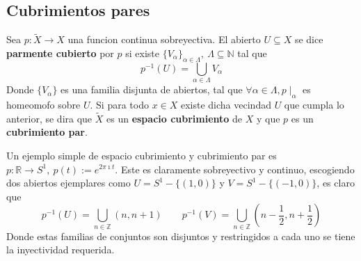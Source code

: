 \subsection{Cubrimientos pares}
\begin{definicion}
Sea \(p : \tilde{X} \to X\) una funcion continua sobreyectiva. El abierto \(U
\subseteq X\) se dice \textbf{parmente cubierto} por \(p\) si existe
\(\{V_\alpha\}_{\alpha \in \Lambda},\ \Lambda \subseteq \mathbb N\) tal que
\[ p^{-1} (U) = \bigcup_{\alpha \in \Lambda} V_\alpha \]
Donde \(\{V_\alpha\}\) es una familia disjunta de abiertos, tal que
\(\forall \alpha \in \Lambda, p \mid_{\alpha}\) es homeomofo sobre \(U\).
Si para todo \(x \in X\) existe dicha vecindad \(U\) que cumpla lo
anterior, se dira que \(\tilde{X}\) es un \textbf{espacio cubrimiento} de \(X\)
y que \(p\) es un \textbf{cubrimiento par}.
\end{definicion}

Un ejemplo simple de espacio cubrimiento y cubrimiento par es \(p :
\mathbb R \to S^1,\ p(t) := e^{2 \pi \imath t}\). Este es claramente
sobreyectivo y continuo, escogiendo dos abiertos ejemplares como \(U =
S^1 - \{(1,0)\}\) y \(V = S^1 - \{(-1,0)\}\), es claro que
\[
    p^{-1} (U) = \bigcup_{n \in \mathbb Z} (n, n+1)
    \qquad p^{-1} (V) = \bigcup_{n \in \mathbb Z} (n - \frac 1 2, n + \frac 1
    2 )
\]
Donde estas familias de conjuntos son disjuntos y restringidos a cada
uno se tiene la inyectividad requerida.

